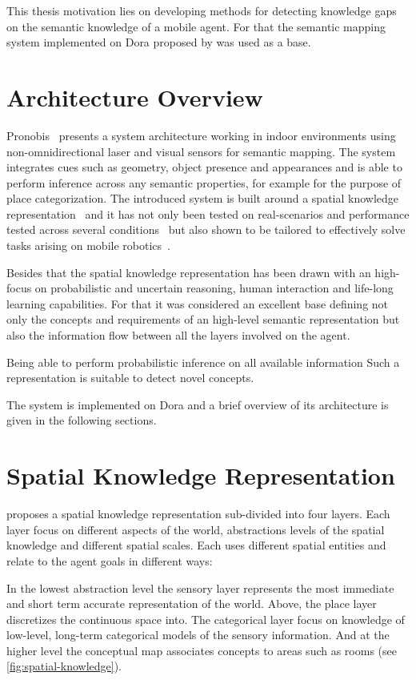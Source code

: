 This thesis motivation lies on developing methods for detecting knowledge gaps
on the semantic knowledge of a mobile agent. For that the semantic mapping system
implemented on \gls{Dora} proposed by \cite{pronobis2011phd} was used as a base.


\section{Architecture Overview}
Pronobis~\cite{pronobis2011phd} presents a system architecture working in indoor environments using
non\hyp{}omnidirectional laser and visual sensors for semantic mapping. The system integrates cues such as geometry,
object presence and appearances and is able to perform inference across any semantic properties,
for example for the purpose of place categorization.
The introduced system is built around a spatial knowledge representation~\cite{pronobis2010ias} and it has not only been tested on real-scenarios
and performance tested across several conditions~\cite{pronobis2007iros} but also shown
to be tailored to effectively solve tasks arising on mobile robotics~\cite{hanheide2011ijcai}.

Besides that the spatial knowledge representation has been drawn with an high-focus on probabilistic
and uncertain reasoning, human interaction and life-long learning capabilities.
For that it was considered an excellent base defining not only the concepts and
requirements of an high-level semantic representation but also the information flow
between all the layers involved on the agent.

Being able to perform probabilistic inference on all available information Such a representation is suitable to detect novel concepts.


The system is implemented on \Gls{Dora} and a brief overview of its architecture is
given in the following sections.

\section{Spatial Knowledge Representation}
\cite{pronobis2010ias} proposes a spatial knowledge representation sub-divided into four layers.
Each layer focus on different aspects of the world, abstractions levels of the spatial knowledge
and different spatial scales. Each uses different spatial entities and relate to the agent
goals in different ways:

In the lowest abstraction level the sensory layer represents the most immediate and short term
accurate representation of the world. Above, the place layer discretizes the continuous
space into. The categorical layer focus on knowledge of low\hyp{}level, long\hyp{}term
categorical models of the sensory information. And at the higher level the conceptual map
associates concepts to areas such as rooms (see \autoref{fig:spatial-knowledge}).

